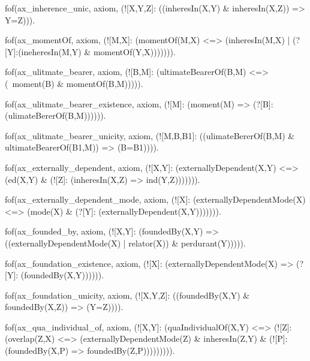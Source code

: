         fof(ax_inherence_unic, axiom, (![X,Y,Z]: ((inheresIn(X,Y) & inheresIn(X,Z)) => Y=Z))).



fof(ax_momentOf, axiom, (![M,X]: (momentOf(M,X) <=> (inheresIn(M,X) | (?[Y]:(ineheresIn(M,Y) & momentOf(Y,X))))))).

fof(ax_ulitmate_bearer, axiom, (![B,M]: (ultimateBearerOf(B,M) <=> (~moment(B) & momentOf(B,M))))).

fof(ax_ulitmate_bearer_existence, axiom, (![M]: (moment(M) => (?[B]: (ulimateBererOf(B,M)))))).

fof(ax_ulitmate_bearer_unicity, axiom, (![M,B,B1]: ((ulimateBererOf(B,M) & ultimateBearerOf(B1,M)) => (B=B1)))).






fof(ax_externally_dependent, axiom, (![X,Y]: (externallyDependent(X,Y) <=>
                                        (ed(X,Y) & (![Z]: (inheresIn(X,Z) => ind(Y,Z))))))).


fof(ax_externally_dependent_mode, axiom, (![X]: (externallyDependentMode(X) <=> (mode(X) & (?[Y]: (externallyDependent(X,Y))))))).



fof(ax_founded_by, axiom, (![X,Y]: (foundedBy(X,Y) => ((externallyDependentMode(X) | relator(X)) & perdurant(Y))))).

fof(ax_foundation_existence, axiom, (![X]: (externallyDependentMode(X) => (?[Y]: (foundedBy(X,Y)))))).

fof(ax_foundation_unicity, axiom, (![X,Y,Z]: ((foundedBy(X,Y) & foundedBy(X,Z)) => (Y=Z)))).


fof(ax_qua_individual_of, axiom, (![X,Y]: (quaIndividualOf(X,Y) <=>
                                      (![Z]:(overlap(Z,X) <=>
                                            (externallyDependentMode(Z) & inheresIn(Z,Y) &
                                            (![P]: (foundedBy(X,P) => foundedBy(Z,P))))))))).

